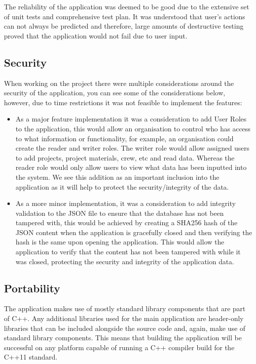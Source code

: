 \documentclass[
  english,
  a4paper,
,tablecaptionabove
]{scrartcl}
\providecommand{\tightlist}{%
  \setlength{\itemsep}{0pt}\setlength{\parskip}{0pt}}
\begin{document}
The reliability of the application was deemed to be good due to the
extensive set of unit tests and comprehensive test plan. It was
understood that user's actions can not always be predicted and
therefore, large amounts of destructive testing proved that the
application would not fail due to user input.

\hypertarget{security}{%
\subsection{Security}\label{security}}

When working on the project there were multiple considerations around
the security of the application, you can see some of the considerations
below, however, due to time restrictions it was not feasible to
implement the features:

\begin{itemize}
\tightlist
\item
  As a major feature implementation it was a consideration to add User
  Roles to the application, this would allow an organisation to control
  who has access to what information or functionality, for example, an
  organisation could create the reader and writer roles. The writer role
  would allow assigned users to add projects, project materials, crew,
  etc and read data. Whereas the reader role would only allow users to
  view what data has been inputted into the system. We see this addition
  as an important inclusion into the application as it will help to
  protect the security/integrity of the data.
\item
  As a more minor implementation, it was a consideration to add
  integrity validation to the JSON file to ensure that the database has
  not been tampered with, this would be achieved by creating a SHA256
  hash of the JSON content when the application is gracefully closed and
  then verifying the hash is the same upon opening the application. This
  would allow the application to verify that the content has not been
  tampered with while it was closed, protecting the security and
  integrity of the application data.
\end{itemize}

\hypertarget{portability}{%
\subsection{Portability}\label{portability}}

The application makes use of mostly standard library components that are
part of C++. Any additional libraries used for the main application are
header-only libraries that can be included alongside the source code
and, again, make use of standard library components. This means that
building the application will be successful on any platform capable of
running a C++ compiler build for the C++11 standard.
\end{document}
